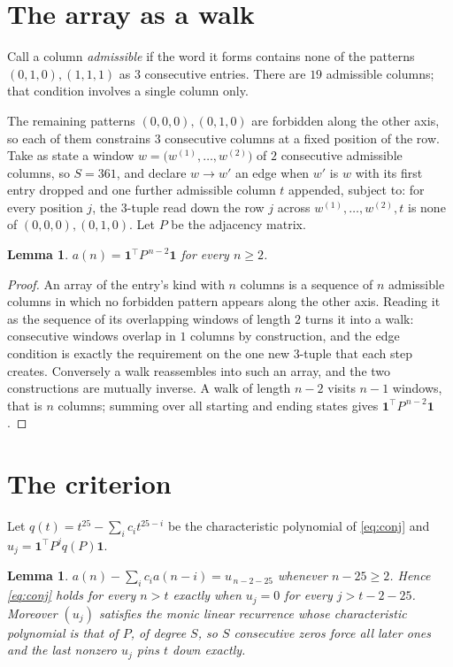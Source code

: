 \documentclass[11pt,a4paper]{article}
\theoremstyle{plain}
\newtheorem{lemma}[theorem]{Lemma}
\theoremstyle{definition}
\begin{document}
\section{The array as a walk}

Call a column \emph{admissible} if the word it forms contains none of the patterns
$(0,1,0), (1,1,1)$ as $3$ consecutive entries. There are $19$ admissible columns; that condition
involves a single column only.

The remaining patterns $(0,0,0), (0,1,0)$ are forbidden along the other axis, so each of them
constrains $3$ consecutive columns at a fixed position of the row. Take as state a
window $w=\bigl(w^{(1)},\dots,w^{(2)}\bigr)$ of $2$ consecutive admissible
columns, so $S=361$, and declare $w\to w'$ an edge when $w'$ is $w$ with its first entry
dropped and one further admissible column $t$ appended, subject to: for every position
$j$, the $3$-tuple read down the row $j$ across $w^{(1)},\dots,w^{(2)},t$
is none of $(0,0,0), (0,1,0)$. Let $P$ be the adjacency matrix.

\begin{lemma}\label{lem:walk}
$a(n)=\mathbf{1}^{\!\top}P^{\,n-2}\mathbf{1}$ for every $n\ge2$.
\end{lemma}

\begin{proof}
An array of the entry's kind with $n$ columns is a sequence of $n$ admissible columns in
which no forbidden pattern appears along the other axis. Reading it as the sequence of its
overlapping windows of length $2$ turns it into a walk: consecutive windows overlap in
$1$ columns by construction, and the edge condition is exactly the requirement on the one
new $3$-tuple that each step creates. Conversely a walk reassembles into such an array,
and the two constructions are mutually inverse. A walk of length $n-2$ visits $n-1$
windows, that is $n$ columns; summing over all starting and ending states gives
$\mathbf{1}^{\!\top}P^{\,n-2}\mathbf{1}$.
\end{proof}

\section{The criterion}

Let $q(t)=t^{25}-\sum_i c_i t^{25-i}$ be the characteristic polynomial of
\eqref{eq:conj} and $u_j=\mathbf{1}^{\!\top}P^{j}q(P)\mathbf{1}$.

\begin{lemma}\label{lem:crit}
$a(n)-\sum_i c_i a(n-i)=u_{\,n-2-25}$ whenever $n-25\ge2$. Hence
\eqref{eq:conj} holds for every $n>t$ exactly when $u_j=0$ for every
$j>t-2-25$. Moreover $(u_j)$ satisfies the monic linear recurrence whose
characteristic polynomial is that of $P$, of degree $S$, so $S$ consecutive zeros force all
later ones and the last nonzero $u_j$ pins $t$ down exactly.
\end{lemma}
\end{document}
